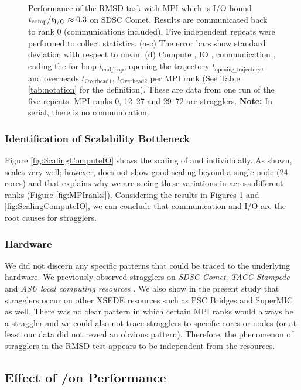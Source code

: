 \begin{figure}
\caption{Performance of the RMSD task with MPI which is I/O-bound ${t}_{\text{comp}}/{t}_{\text{I/O}} \approx 0.3$ on SDSC Comet.
Results are communicated back to rank 0 (communications included). Five independent repeats were performed to collect statistics. (a-c) The error bars show
standard deviation with respect to mean. (d) Compute \tcomp, IO \tIO, communication \tcomm, ending the for loop \texttt{$t_{\text{end\_loop}}$},
  opening the trajectory \texttt{$t_{\text{opening\_trajectory}}$}, and overheads \texttt{$t_{\text{Overhead1}}$},  \texttt{$t_{\text{Overhead2}}$} per MPI rank (See Table \ref{tab:notation} for the definition).
These are data from one run of the five repeats. MPI ranks 0, 12--27 and 29--72 are stragglers. \textbf{Note:} In serial, there is no communication.}
\label{fig:MPIwithIO}
\end{figure} 

\subsubsection*{Identification of Scalability Bottleneck}

Figure \ref{fig:ScalingComputeIO} shows the scaling of \tcomp and \tIO individulally. 
As shown, \tcomp scales very well; however, \tIO does not show good scaling beyond a single node (24 cores) and that explains why we are seeing these variations in \tIO across different ranks (Figure \ref{fig:MPIranks}). 
Considering the results in Figures \ref{fig:MPIwithIO} and \ref{fig:ScalingComputeIO}, we can conclude that communication and I/O are the root causes for stragglers. 

\subsubsection*{Hardware}
We did not discern any specific patterns that could be traced to the underlying hardware. 
We previously observed stragglers on \emph{SDSC Comet}, \emph{TACC Stampede} and \emph{ASU local computing resources} \cite{Khoshlessan:2017ab}. 
We also show in the present study that stragglers occur on other XSEDE resources such as PSC Bridges and SuperMIC as well.
There was no clear pattern in which certain MPI ranks would always be a straggler and we could also not trace stragglers to specific cores or nodes (or at least our data did not reveal an obvious pattern). 
Therefore, the phenomenon of stragglers in the RMSD test appears to be independent from the resources.

\subsection{Effect of \tcomp/\tIO on Performance}
\label{bound}

